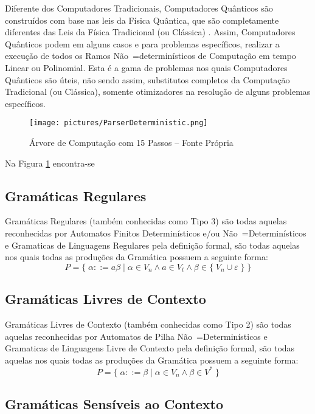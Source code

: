 {    Diferente dos Computadores Tradicionais,
    Computadores Quânticos são construídos com base nas leis da Física Quântica,
    que são completamente diferentes das Leis da Física
    Tradicional (ou Clássica)
    \cite{churchTuringQuantumComputer}.
    Assim,
    Computadores Quânticos podem em alguns casos e
    para problemas específicos,
    realizar a execução de todos os Ramos Não~=determinísticos
    de Computação em tempo Linear ou Polinomial.
    Esta é a gama de problemas nos quais Computadores Quânticos são úteis,
    não sendo assim,
    substitutos completos da Computação Tradicional (ou Clássica),
    somente otimizadores na resolução de alguns problemas específicos.
    \begin{figure}[H]
    \centering
    \texttt{[image: pictures/ParserDeterministic.png]}
    \caption{Árvore de Computação com 15 Passos -- Fonte Própria}
    \label{fig:pictures/ParserDeterministic.png}
    \end{figure}

    Na Figura \ref{fig:pictures/ParserDeterministic.png} encontra-se


\subsection*{Gramáticas Regulares}

    Gramáticas Regulares (também conhecidas como Tipo 3) são todas aquelas reconhecidas
    por Automatos Finitos Determinísticos e/ou Não~=Determinísticos e
    Gramaticas de Linguagens Regulares pela definição formal,
    são todas aquelas nos quais todas as produções da Gramática possuem a seguinte forma:
    $$ P = \{\; \alpha ::= a \beta \;|\; \alpha \in V_n \land a \in V_t
                \land \beta \in \{\; V_n \cup \varepsilon\; \} \;\} $$

\subsection*{Gramáticas Livres de Contexto}

    Gramáticas Livres de Contexto (também conhecidas como Tipo 2) são todas
    aquelas reconhecidas por Automatos de Pilha Não~=Determinísticos e
    Gramaticas de Linguagens Livre de Contexto pela definição formal,
    são todas aquelas nos quais todas as produções da Gramática possuem a seguinte forma:
    $$ P = \{\; \alpha ::= \beta \;|\; \alpha \in V_n \land \beta \in V^* \;\} $$


\subsection*{Gramáticas Sensíveis ao Contexto}

}
